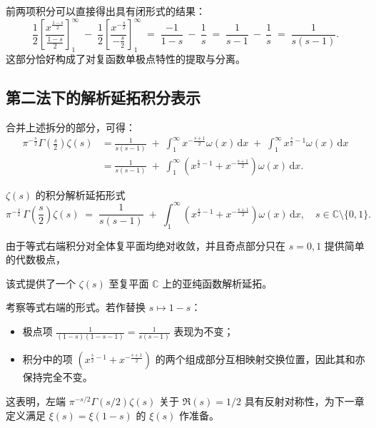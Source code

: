 前两项积分可以直接得出具有闭形式的结果：
\[
  \frac{1}{2} \left[ \frac{x^{\frac{1-s}{2}}}{\frac{1-s}{2}} \right]_1^{\infty} \;-\; \frac{1}{2} \left[ \frac{x^{-\frac{s}{2}}}{-\frac{s}{2}} \right]_1^{\infty} \;=\; \frac{-1}{1-s} \ - \ \frac{1}{s} \;=\; \frac{1}{s-1} \ - \ \frac{1}{s} \;=\; \frac{1}{s(s-1)}.
\]
这部分恰好构成了对复函数单极点特性的提取与分离。

\subsection{第二法下的解析延拓积分表示}

合并上述拆分的部分，可得：
\begin{align*}
  \pi^{-\frac{s}{2}} \Gamma\!\left(\frac{s}{2}\right) \zeta(s)
  &= \frac{1}{s(s-1)} \;+\;  \int_1^{\infty} x^{-\frac{s+1}{2}} \omega(x) \,\mathrm{d}x \;+\;  \int_1^{\infty} x^{\frac{s}{2}-1} \omega(x) \,\mathrm{d}x \\
  &= \frac{1}{s(s-1)} \;+\;  \int_1^{\infty} \left( x^{\frac{s}{2}-1} + x^{-\frac{s+1}{2}} \right) \omega(x) \,\mathrm{d}x.
\end{align*}
\begin{theorem}{$\zeta(s)$ 的积分解析延拓形式}{}
\begin{equation}
\label{eq:analytic_continuation}
  \pi^{-\frac{s}{2}} \, \Gamma\!\left(\frac{s}{2}\right) \zeta(s) \;=\; \frac{1}{s(s-1)} \;+\;  \int_1^{\infty} \left( x^{\frac{s}{2}-1} + x^{-\frac{s+1}{2}} \right) \omega(x) \,\mathrm{d}x, \quad s \in \mathbb{C} \setminus \{0,1\}.
\end{equation}

由于等式右端积分对全体复平面均绝对收敛，并且奇点部分只在 $s=0, 1$ 提供简单的代数极点，

该式提供了一个 $\zeta(s)$ 至复平面 $\mathbb{C}$ 上的亚纯函数解析延拓。
\end{theorem}

考察等式右端的形式。若作替换 $s \mapsto 1-s$：
\begin{itemize}
    \item 极点项 $\frac{1}{(1-s)(1-s-1)} = \frac{1}{s(s-1)}$ 表现为不变；
    \item 积分中的项 $\left( x^{\frac{s}{2}-1} + x^{-\frac{s+1}{2}} \right)$ 的两个组成部分互相映射交换位置，因此其和亦保持完全不变。
\end{itemize}

这表明，左端 $\pi^{-s/2} \Gamma(s/2) \zeta(s)$ 关于 $\Re(s)=1/2$ 具有反射对称性，为下一章定义满足 $\xi(s)=\xi(1-s)$ 的 $\xi(s)$ 作准备。

